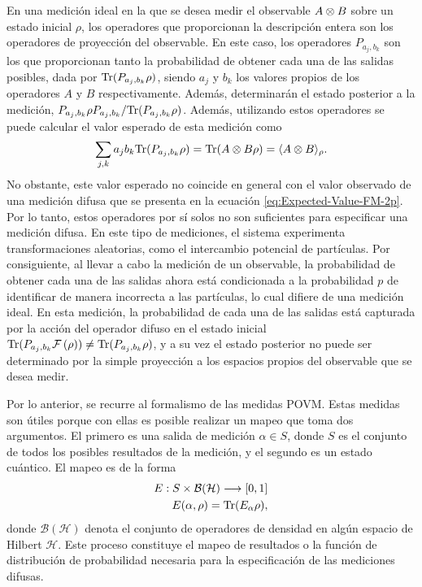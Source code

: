 En una medición ideal en la que se desea medir el observable $A\otimes B$ sobre
un estado inicial $\rho$, los operadores que proporcionan la descripción entera
son los operadores de proyección del observable. En este caso, los operadores
$P_{a_j, b_k}$ son los que proporcionan tanto la probabilidad de obtener cada
una de las salidas posibles, dada por ${\rm Tr}(P_{a_j,b_k}\rho )$, siendo $a_j$ y
$b_k$ los valores propios de los operadores $A$ y $B$ respectivamente. Además,
determinarán el estado posterior a la medición, $P_{a_j,b_k}\rho
P_{a_j,b_k}/{\rm Tr}(P_{a_j,b_k}\rho )$. Además, utilizando estos operadores se
puede calcular el valor esperado de esta medición como \[\sum_{j,k}a_j
b_k{\rm Tr}(P_{a_j,b_k}\rho)= {\rm Tr}(A\otimes B \rho)=\langle A\otimes
B\rangle_{\rho}.\] No obstante, este valor esperado no coincide en general con
el valor observado de una medición difusa que se presenta en la ecuación
{\eqref{eq:Expected-Value-FM-2p}}. Por lo tanto, estos operadores por sí solos
no son suficientes para especificar una medición difusa. En este tipo de
mediciones, el sistema experimenta transformaciones aleatorias, como el
intercambio potencial de partículas. Por consiguiente, al llevar a cabo la
medición de un observable, la probabilidad de obtener cada una de las salidas
ahora está condicionada a la probabilidad $p$ de identificar de manera
incorrecta a las partículas, lo cual difiere de una medición ideal. En esta
medición, la probabilidad de cada una de las salidas está capturada por la
acción del operador difuso en el estado inicial
${\rm Tr}(P_{a_j,b_k}\mathcal{F}\left(\rho\right))\ne{\rm Tr}(P_{a_j,b_k}\rho ) $, y a su vez el estado
posterior no puede ser determinado por la simple proyección a los espacios
propios del observable que se desea medir.


Por lo anterior, se recurre al formalismo de las medidas POVM\@. Estas medidas
son útiles porque con ellas es posible realizar un mapeo que toma dos
argumentos. El primero es una salida de medición $\alpha \in S $, donde $S$ es
el conjunto de todos los posibles resultados de la medición, y el segundo es un
estado cuántico. El mapeo es de la forma 
\begin{equation}\begin{split}
    E:S\times \mathcal{B(H)}\longrightarrow [0,1]\\
    E(\alpha,\rho)={\rm Tr}(E_\alpha\rho),
\end{split}\end{equation} donde $\mathcal{B(H)}$ denota el conjunto de operadores de densidad en algún espacio de Hilbert $\mathcal{H}$. 
Este proceso constituye el mapeo de resultados o la función de
distribución de probabilidad necesaria para la especificación de las mediciones
difusas.

